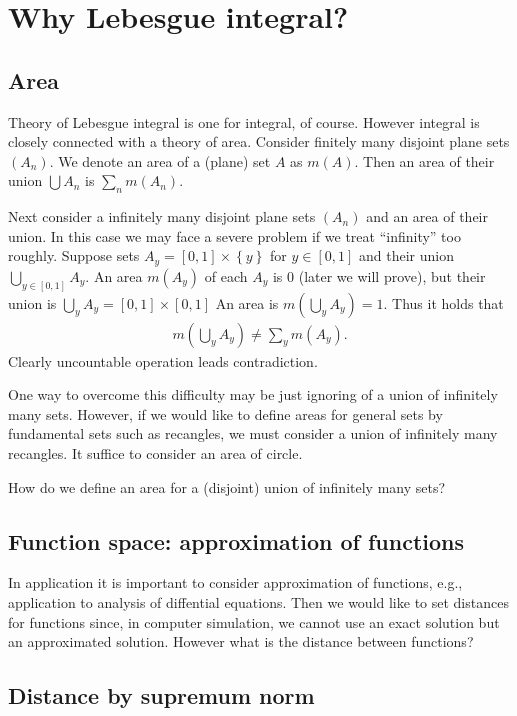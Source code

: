 \documentclass[openany, a4paper, oneside]{book}
\theoremstyle{break}
\theoremstyle{breakdefn}
\newcommand{\rbk}[1]{\left (#1\right)}
\newcommand{\sqbk}[1]{\left[#1\right]}
\newcommand{\cbk}[1]{\left\{#1\right\}}
\begin{document}
\section{Why Lebesgue integral?}
\label{sec-7-1-1}
\subsection{Area}
\label{sec-7-1-1-1}

Theory of Lebesgue integral is one for integral, of course.
However integral is closely connected with a theory of area.
Consider finitely many disjoint plane sets $(A_n)$.
We denote an area of a (plane) set $A$ as $m (A)$.
Then an area of their union $\bigcup A_n$ is $\sum_n m (A_n)$.

Next consider a infinitely many disjoint plane sets $(A_n)$ and an area of their union.
In this case we may face a severe problem if we treat ``infinity'' too roughly.
Suppose sets $A_y = \sqbk{0, 1} \times \cbk{y}$ for $y \in \sqbk{0, 1}$
and their union $\bigcup_{y \in \sqbk{0, 1}} A_y$.
An area $m (A_y)$ of each $A_y$ is 0 (later we will prove), but their union is $\bigcup_y A_y = \sqbk{0, 1} \times \sqbk{0, 1}$
An area is $m (\bigcup_y A_y) = 1$.
Thus it holds that
\begin{align}
 m \rbk{ \bigcup_y A_y}
 \neq
 \sum_y m (A_y).
\end{align}
Clearly uncountable operation leads contradiction.

One way to overcome this difficulty may be just ignoring of a union of infinitely many sets.
However, if we would like to define areas for general sets by fundamental sets such as recangles,
we must consider a union of infinitely many recangles.
It suffice to consider an area of circle.

How do we define an area for a (disjoint) union of infinitely many sets?
\subsection{Function space: approximation of functions}
\label{sec-7-1-1-2}

In application it is important to consider approximation of functions,
e.g., application to analysis of diffential equations.
Then we would like to set distances for functions since,
in computer simulation, we cannot use an exact solution but an approximated solution.
However what is the distance between functions?
\subsection{Distance by supremum norm}
\label{sec-7-1-1-3}
\end{document}
